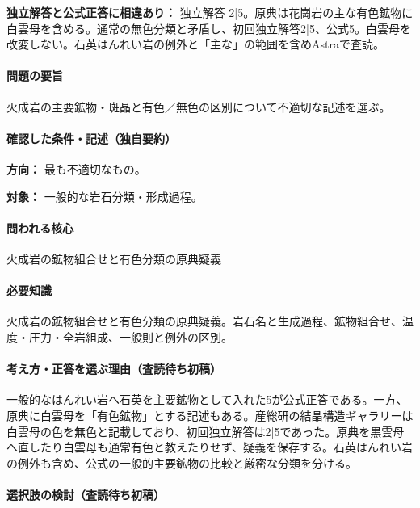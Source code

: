 \par\textbf{独立解答と公式正答に相違あり：} 独立解答 2|5。原典は花崗岩の主な有色鉱物に白雲母を含める。通常の無色分類と矛盾し、初回独立解答2|5、公式5。白雲母を改変しない。石英はんれい岩の例外と「主な」の範囲を含めAstraで査読。

\paragraph{問題の要旨} 火成岩の主要鉱物・斑晶と有色／無色の区別について不適切な記述を選ぶ。

\paragraph{確認した条件・記述（独自要約）}\mbox{}\par

\noindent\textbf{方向：} 最も不適切なもの。\par

\noindent\textbf{対象：} 一般的な岩石分類・形成過程。\par

\paragraph{問われる核心} 火成岩の鉱物組合せと有色分類の原典疑義

\paragraph{必要知識} 火成岩の鉱物組合せと有色分類の原典疑義。岩石名と生成過程、鉱物組合せ、温度・圧力・全岩組成、一般則と例外の区別。

\paragraph{考え方・正答を選ぶ理由（査読待ち初稿）} 一般的なはんれい岩へ石英を主要鉱物として入れた5が公式正答である。一方、原典に白雲母を「有色鉱物」とする記述もある。産総研の結晶構造ギャラリーは白雲母の色を無色と記載しており、初回独立解答は2|5であった。原典を黒雲母へ直したり白雲母も通常有色と教えたりせず、疑義を保存する。石英はんれい岩の例外も含め、公式の一般的主要鉱物の比較と厳密な分類を分ける。

\paragraph{選択肢の検討（査読待ち初稿）}\mbox{}\par

